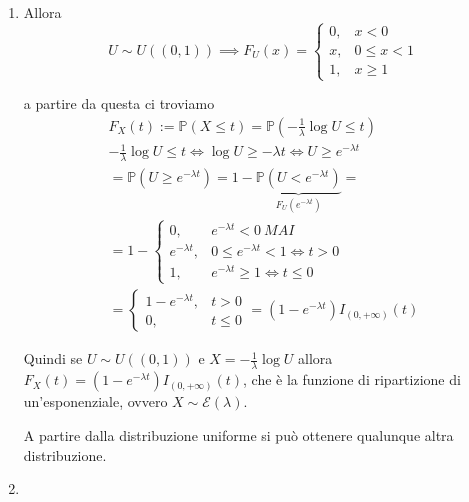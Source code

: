 \subsubsection{}
\begin{enumerate}
\item Allora\begin{equation*}
U\sim U\left(\left( 0,1\right)\right) \implies F_{U}\left( x\right) =\begin{cases}
0, & x< 0\\
x, & 0\leq x< 1\\
1, & x\geq 1
\end{cases}
\end{equation*}

a partire da questa ci troviamo\begin{gather*}
F_{X}\left( t\right) :=\mathbb{P}\left( X\leq t\right) =\mathbb{P}\left( -\frac{1}{\lambda }\log U\leq t\right)\\
-\frac{1}{\lambda }\log U\leq t\iff \log U\geq -\lambda t\iff U\geq e^{-\lambda t}\\
=\mathbb{P}\left( U\geq e^{-\lambda t}\right) =1-\underbrace{\mathbb{P}\left( U< e^{-\lambda t}\right)}_{F_{U}\left( e^{-\lambda t}\right)} =\\
=1-\begin{cases}
0, & e^{-\lambda t} < 0\ MAI\\
e^{-\lambda t} , & 0\leq e^{-\lambda t} < 1\iff t >0\\
1, & e^{-\lambda t} \geq 1\iff t\leq 0
\end{cases}\\
=\begin{cases}
1-e^{-\lambda t} , & t >0\\
0, & t\leq 0
\end{cases} =\left( 1-e^{-\lambda t}\right) I_{\left( 0,+\infty \right)}\left( t\right)
\end{gather*}

Quindi se $U\sim U\left(\left( 0,1\right)\right)$ e $X=-\frac{1}{\lambda }\log U$ allora $F_{X}\left( t\right) =\left( 1-e^{-\lambda t}\right) I_{\left( 0,+\infty \right)}\left( t\right)$, che è la funzione di ripartizione di un'esponenziale, ovvero $X\sim \mathcal{E}\left( \lambda \right)$.

A partire dalla distribuzione uniforme si può ottenere qualunque altra distribuzione.
\item 
\end{enumerate}
\Esercizio{}

